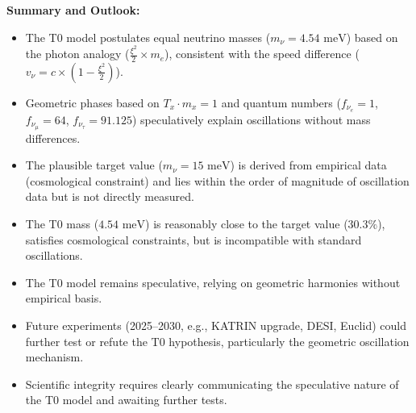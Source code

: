\documentclass[12pt,a4paper]{article}
\newcommand{\xipar}{\xi}
\begin{document}
	\begin{important}
		\textbf{Summary and Outlook:}
		\begin{itemize}
			\item The T0 model postulates equal neutrino masses (\(m_\nu = 4.54 \text{ meV}\)) based on the photon analogy (\(\frac{\xipar^2}{2} \times m_e\)), consistent with the speed difference (\(v_\nu = c \times \left(1 - \frac{\xipar^2}{2}\right)\)).
			\item Geometric phases based on \(T_x \cdot m_x = 1\) and quantum numbers (\(f_{\nu_e} = 1\), \(f_{\nu_\mu} = 64\), \(f_{\nu_\tau} = 91.125\)) speculatively explain oscillations without mass differences.
			\item The plausible target value (\(m_\nu = 15 \text{ meV}\)) is derived from empirical data (cosmological constraint) and lies within the order of magnitude of oscillation data but is not directly measured.
			\item The T0 mass (\(4.54 \text{ meV}\)) is reasonably close to the target value (\(30.3\%\)), satisfies cosmological constraints, but is incompatible with standard oscillations.
			\item The T0 model remains speculative, relying on geometric harmonies without empirical basis.
			\item Future experiments (2025–2030, e.g., KATRIN upgrade, DESI, Euclid) could further test or refute the T0 hypothesis, particularly the geometric oscillation mechanism.
			\item Scientific integrity requires clearly communicating the speculative nature of the T0 model and awaiting further tests.
		\end{itemize}
	\end{important}
	
\end{document}
